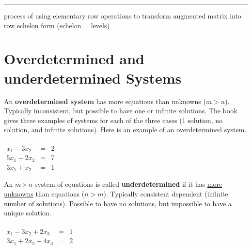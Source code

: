 \rule[0.01in]{\textwidth}{0.0025in}




\begin{tcolorbox}[colback=yellow!10!,colframe=gray!15!]
 \begin{definition}
  process of using elementary row operations to transform augmented matrix into row echelon form (echelon = levels)
 \end{definition}
\end{tcolorbox} 













\section{Overdetermined and underdetermined Systems}

 
An {\color{blue}\textbf{overdetermined system}}  has  more equations than unknowns ($m > n$).  Typically inconsistent, but possible to have one or infinite solutions. The book gives three examples of  systems for each of the three cases (1 solution, no solution, and infinite solutions).  Here is an example of an overdetermined system.   
 


\begin{example}
$ \begin{array}{rcl}& & \\ x_1 - 3x_2 & = & 2 \\ 5x_1 - 2 x_2 & = & 7  \\ 3x_1 + x_2 &=& 1 \end{array}$
\end{example}



 

An $m \times n$  system of equations is called {\color{blue}\textbf{underdetermined}} if it has  \underline{more unknowns} than equations ($n > m$).   Typically consistent dependent (infinite number of solutions).  Possible to have no solutions, but impossible to have a unique solution.  

 



\begin{example}
$ \begin{array}{rcl}& & \\ x_1 - 3x_2  + 2 x_3 & = & 1 \\ 3x_1 + 2 x_2 - 4x_3 & = & 2 \end{array}$
\end{example}





